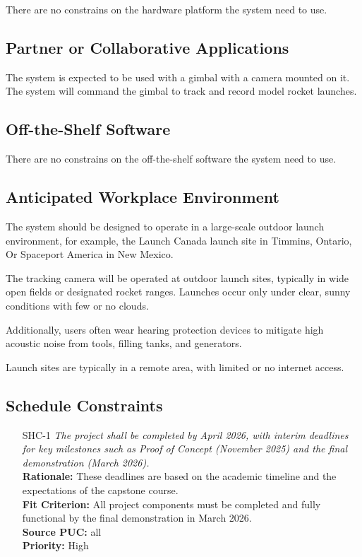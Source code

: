 \documentclass[12pt]{article}
\begin{document}
There are no constrains on the hardware platform the system need to use.

\subsection{Partner or Collaborative Applications}

The system is expected to be used with a gimbal with a camera mounted on it.
The system will command the gimbal to track and record model rocket launches.

\subsection{Off-the-Shelf Software}

There are no constrains on the off-the-shelf software the system need to use.

\subsection{Anticipated Workplace Environment}

The system should be designed to operate in a large-scale outdoor launch
environment, for example, the Launch Canada launch site in Timmins, Ontario, Or
Spaceport America in New Mexico.

The tracking camera will be operated at outdoor launch sites, typically in wide
open fields or designated rocket ranges. Launches occur only under clear, sunny
conditions with few or no clouds.

Additionally, users often wear hearing protection devices to mitigate high
acoustic noise from tools, filling tanks, and generators.

Launch sites are typically in a remote area, with limited or no internet
access.

\subsection{Schedule Constraints}

\begin{itemize}[leftmargin=*]
  \item[SHC-1] \emph{The project shall be completed by April 2026, with interim
          deadlines for key milestones such as Proof of Concept (November 2025) and the
          final demonstration (March 2026).}\\[2mm]
        \textbf{Rationale:} These deadlines are based on the academic timeline and the expectations of the capstone course.\\
        \textbf{Fit Criterion:} All project components must be completed and fully functional by the final demonstration in March 2026.\\
        \textbf{Source PUC:} all\\
        \textbf{Priority:} High
\end{itemize}
\end{document}
